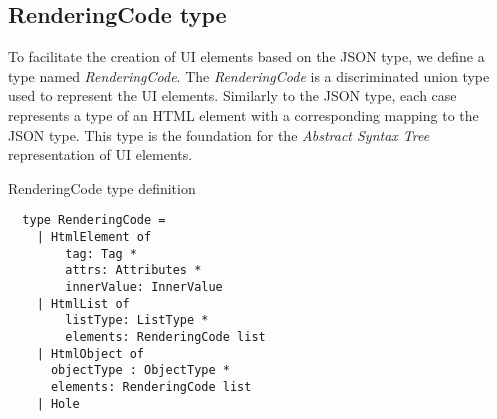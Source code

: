\subsection{RenderingCode type}
To facilitate the creation of UI elements based on the JSON type, we define a type named \emph{RenderingCode}.
The \emph{RenderingCode} is a discriminated union type used to represent the UI elements.
Similarly to the JSON type, each case represents a type of an HTML element with a corresponding mapping to the JSON type.
This type is the foundation for the \emph{Abstract Syntax Tree} representation of UI elements.
\begin{listing}[H]
	\caption {RenderingCode type definition}
	\begin{lstlisting}
  type RenderingCode =
    | HtmlElement of
        tag: Tag *
        attrs: Attributes *
        innerValue: InnerValue
    | HtmlList of
        listType: ListType *
        elements: RenderingCode list
    | HtmlObject of
      objectType : ObjectType *
      elements: RenderingCode list
    | Hole
  \end{lstlisting}
\end{listing}

